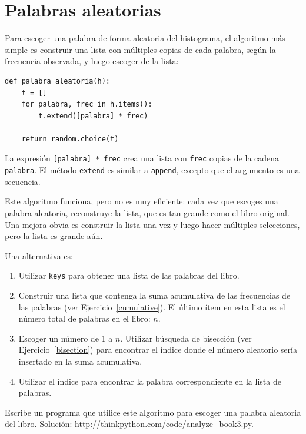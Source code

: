 \documentclass[10pt]{book}
\begin{document}
\section{Palabras aleatorias}
\label{randomwords}

Para escoger una palabra de forma aleatoria del histograma, el algoritmo más simple
es construir una lista con múltiples copias de cada palabra, según
la frecuencia observada, y luego escoger de la lista:

\begin{verbatim}
def palabra_aleatoria(h):
    t = []
    for palabra, frec in h.items():
        t.extend([palabra] * frec)

    return random.choice(t)
\end{verbatim}
%
La expresión {\tt [palabra] * frec} crea una lista con {\tt frec}
copias de la cadena {\tt palabra}.  El método {\tt extend}
es similar a {\tt append}, excepto que el argumento es
una secuencia.

Este algoritmo funciona, pero no es muy eficiente: cada vez que
escoges una palabra aleatoria, reconstruye la lista, que es tan grande como
el libro original.  Una mejora obvia es construir la lista
una vez y luego hacer múltiples selecciones, pero la lista es grande aún.

Una alternativa es:

\begin{enumerate}

\item Utilizar {\tt keys} para obtener una lista de las palabras del libro.

\item Construir una lista que contenga la suma acumulativa de las frecuencias
  de las palabras (ver Ejercicio~\ref{cumulative}).  El último ítem
  en esta lista es el número total de palabras en el libro: $n$.

\item Escoger un número de 1 a $n$.  Utilizar búsqueda de bisección
  (ver Ejercicio~\ref{bisection}) para encontrar el índice donde el número
  aleatorio sería insertado en la suma acumulativa.

\item Utilizar el índice para encontrar la palabra correspondiente en la lista de palabras.

\end{enumerate}

\begin{exercise}
\label{randhist}

Escribe un programa que utilice este algoritmo para escoger una palabra aleatoria del
libro.  Solución:
\url{http://thinkpython.com/code/analyze_book3.py}.

\end{exercise}
\end{document}
